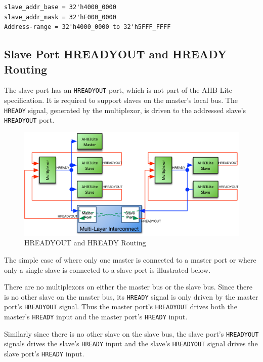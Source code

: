 \begin{verbatim}
slave_addr_base = 32'h4000_0000
slave_addr_mask = 32'hE000_0000
Address-range = 32'h4000_0000 to 32'h5FFF_FFFF
\end{verbatim}

\subsection{Slave Port HREADYOUT and HREADY
Routing}\label{slave-port-hreadyout-and-hready-routing}

The slave port has an \texttt{HREADYOUT} port, which is not part of the AHB-Lite
specification. It is required to support slaves on the master's local
bus. The \texttt{HREADY} signal, generated by the multiplexor, is driven to the
addressed slave's \texttt{HREADYOUT} port.

\begin{figure}[thb]
	\centering
	\includegraphics[]{assets/img/ahb-lite-switch-sys4}
	\caption{HREADYOUT and HREADY Routing}
	\label{fig:hready-hready-routing}
\end{figure}

The simple case of where only one master is connected to a master port
or where only a single slave is connected to a slave port is illustrated
below.

There are no multiplexors on either the master bus or the slave bus.
Since there is no other slave on the master bus, its \texttt{HREADY} signal is
only driven by the master port's \texttt{HREADYOUT} signal. Thus the master
port's \texttt{HREADYOUT} drives both the master's \texttt{HREADY} input and the master
port's \texttt{HREADY} input.

Similarly since there is no other slave on the slave bus, the slave
port's \texttt{HREADYOUT} signals drives the slave's \texttt{HREADY} input and the slave's
\texttt{HREADYOUT} signal drives the slave port's \texttt{HREADY} input.

